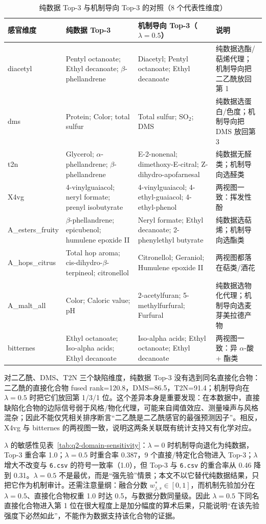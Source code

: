 \begin{table}[htbp]
  \centering
  \caption{纯数据 Top-3 与机制导向 Top-3 的对照（8 个代表性维度）}
  \label{tab:q2-top3}
  \footnotesize
  \setlength{\tabcolsep}{3pt}
  \begin{tabularx}{\textwidth}{@{}l X X X@{}}
    \toprule
    感官维度 & 纯数据 Top-3 & 机制导向 Top-3（$\lambda=0.5$） & 说明 \\
    \midrule
    diacetyl & Pentyl octanoate; Ethyl decanoate; $\beta$-phellandrene & Diacetyl; Pentyl octanoate; Ethyl decanoate & 纯数据选酯/萜烯代理；机制导向把二乙酰放回第 1 \\
    dms & Protein; Color; total sulfur & Total sulfur; SO$_2$; DMS & 纯数据选蛋白/色度；机制导向把 DMS 放回第 3 \\
    t2n & Glycerol; $\alpha$-phellandrene; $\beta$-phellandrene & E-2-nonenal; dimethoxy-E-citral; Z-dihydro-apofarnesal & 纯数据无醛类；机制导向选醛类 \\
    X4vg & 4-vinylguaiacol; neryl formate; prenyl isobutyrate & 4-vinylguaiacol; 4-ethyl-guaiacol; 4-ethyl-phenol & 两视图一致：挥发性酚 \\
    A\_esters\_fruity & $\beta$-phellandrene; epicubenol; humulene epoxide II & Neryl formate; Ethyl decanoate; 2-phenylethyl butyrate & 纯数据选萜烯；机制导向选酯类 \\
    A\_hops\_citrus & Total hop aroma; cis-dihydro-$\beta$-terpineol; citronellol & Citronellol; Geraniol; Humulene epoxide II & 两视图都落在萜类/酒花 \\
    A\_malt\_all & Color; Caloric value; pH & 2-acetylfuran; 5-methylfurfural; Furfural & 纯数据选物化代理；机制导向选麦芽美拉德产物 \\
    bitternes & Ethyl octanoate; Iso-alpha acids; Ethyl decanoate & Iso-alpha acids; Ethyl octanoate; Ethyl decanoate & 两视图一致：异 $\alpha$-酸 + 酯类 \\
    \bottomrule
  \end{tabularx}
\end{table}

对二乙酰、DMS、T2N 三个缺陷维度，纯数据 Top-3 没有选到同名直接化合物：二乙酰的直接化合物 fused rank=120.8，DMS=86.5，T2N=91.4；机制导向在 $\lambda=0.5$ 时把它们放回第 1/3/1 位。这个差异本身是重要发现：在本数据中，直接缺陷化合物的边际信号弱于风格/物化代理，可能来自阈值效应、测量噪声与风格混杂；因此不能仅凭相关排序断言“二乙酰是二乙酰感官的最强预测因子”。相反，X4vg 与 bitternes 的两视图一致，说明这两条关联既有统计支持又有化学对应。

$\lambda$ 的敏感性见表~\ref{tab:q2-domain-sensitivity}：$\lambda=0$ 时机制导向退化为纯数据，Top-3 重合率 1.0；$\lambda=0.5$ 时重合率 0.387，9 个直接/特定化合物进入 Top-3；$\lambda$ 增大不改变与 \texttt{6.csv} 的符号一致率（1.0），但 Top-3 与 \texttt{6.csv} 的重合率从 0.46 降到 0.31。$\lambda=0.5$ 不是最优，而是“强先验”情景；本文不以它替代纯数据结果，只把它作为机制审计。还需注意量纲：融合分数 $w_{j,s}^{*}\in[0,1]$，而机制先验加分在 $\lambda=0.5$、直接化合物权重 1.0 时达 0.5，与数据分数同量级。因此 $\lambda=0.5$ 下同名直接化合物进入第 1 位在很大程度上是加分幅度的算术后果，只能说明“在该先验强度下必然如此”，不能作为数据支持该化合物的证据。

